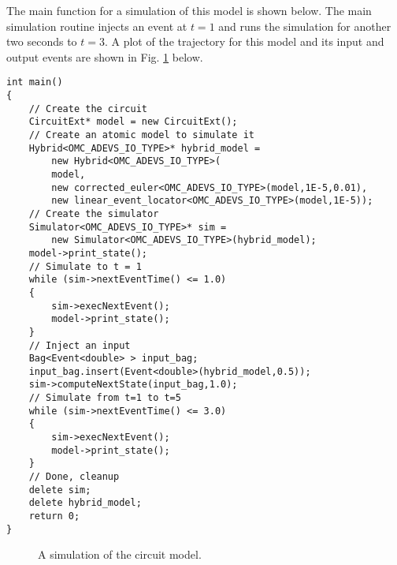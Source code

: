 The main function for a simulation of this model is shown below. The main simulation routine injects an event at $t=1$ and runs the simulation for another two seconds to $t=3$. A plot of the trajectory for this model and its input and output events are shown in Fig. \ref{fig:circuit} below.
\begin{verbatim}
int main()
{
    // Create the circuit
    CircuitExt* model = new CircuitExt();
    // Create an atomic model to simulate it
    Hybrid<OMC_ADEVS_IO_TYPE>* hybrid_model =
        new Hybrid<OMC_ADEVS_IO_TYPE>(
        model,
        new corrected_euler<OMC_ADEVS_IO_TYPE>(model,1E-5,0.01),
        new linear_event_locator<OMC_ADEVS_IO_TYPE>(model,1E-5));
    // Create the simulator
    Simulator<OMC_ADEVS_IO_TYPE>* sim =
        new Simulator<OMC_ADEVS_IO_TYPE>(hybrid_model);
    model->print_state();
    // Simulate to t = 1
    while (sim->nextEventTime() <= 1.0)
    {
        sim->execNextEvent();
        model->print_state();
    }
    // Inject an input
    Bag<Event<double> > input_bag;
    input_bag.insert(Event<double>(hybrid_model,0.5));
    sim->computeNextState(input_bag,1.0);
    // Simulate from t=1 to t=5
    while (sim->nextEventTime() <= 3.0)
    {
        sim->execNextEvent();
        model->print_state();
    }
    // Done, cleanup
    delete sim;
    delete hybrid_model;
    return 0;
}
\end{verbatim}

\begin{figure}[ht]
\centering
{}
\caption{A simulation of the circuit model.}
\label{fig:circuit}
\end{figure}
